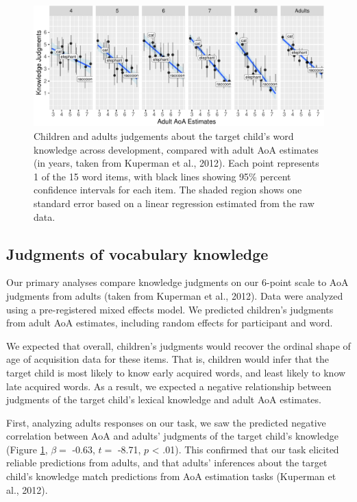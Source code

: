 \documentclass[10pt, letterpaper]{article}
\newenvironment{CodeChunk}{}{}
\begin{document}
\begin{CodeChunk}
\begin{figure}[tb]
\includegraphics{figs/development-1} \caption[Children and adults judgements about the target child's word knowledge across development, compared with adult AoA estimates (in years, taken from Kuperman et al., 2012)]{Children and adults judgements about the target child's word knowledge across development, compared with adult AoA estimates (in years, taken from Kuperman et al., 2012). Each point represents 1 of the 15 word items, with black lines showing 95\% percent confidence intervals for each item. The shaded region shows one standard error based on a linear regression estimated from the raw data.}\label{fig:development}
\end{figure}
\end{CodeChunk}

\hypertarget{judgments-of-vocabulary-knowledge}{%
\subsection{Judgments of vocabulary
knowledge}\label{judgments-of-vocabulary-knowledge}}

Our primary analyses compare knowledge judgments on our 6-point scale to
AoA judgments from adults (taken from Kuperman et al., 2012). Data were
analyzed using a pre-registered mixed effects model. We predicted
children's judgments from adult AoA estimates, including random effects
for participant and word.

We expected that overall, children's judgments would recover the ordinal
shape of age of acquisition data for these items. That is, children
would infer that the target child is most likely to know early acquired
words, and least likely to know late acquired words. As a result, we
expected a negative relationship between judgments of the target child's
lexical knowledge and adult AoA estimates.

First, analyzing adults responses on our task, we saw the predicted
negative correlation between AoA and adults' judgments of the target
child's knowledge (Figure \ref{fig:development}, \(\beta =\) -0.63,
\(t =\) -8.71, \(p\) \textless{} .01). This confirmed that our task
elicited reliable predictions from adults, and that adults' inferences
about the target child's knowledge match predictions from AoA estimation
tasks (Kuperman et al., 2012).
\end{document}
